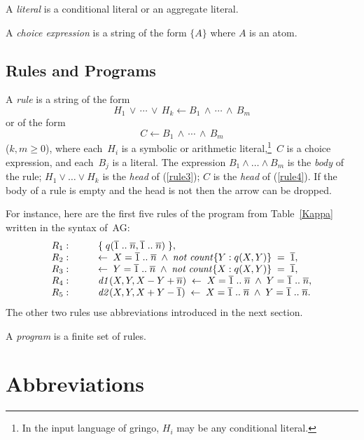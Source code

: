 \documentclass{tlp}
\def\ar{\leftarrow}
\def\beq{\begin{equation}}
\def\eeq#1{\label{#1}\end{equation}}
\def\ba{\begin{array}}
\def\ea{\end{array}}
\def\no{{\it not}}
\begin{document}
A {\sl literal} is a conditional literal or an aggregate literal.

A {\sl choice expression} is a string of the form $\{A\}$ where
$A$ is an atom.


\subsection{Rules and Programs} \label{rp}

A {\sl rule} is a string of the form
\beq
H_1\,\lor\,\cdots\,\lor\,H_k \ar B_1\,\land\,\cdots\,\land\,B_m
\eeq{rule3}
or of the form
\beq
C \ar B_1\,\land\,\cdots\,\land\,B_m
\eeq{rule4}
($k,m\geq 0$), where each~$H_i$ is a symbolic or arithmetic
literal,\footnote{In the input language of {\sc gringo}, $H_i$ may be any
conditional literal.}~$C$ is a choice
expression, and each~$B_j$ is a literal.
The expression $B_1 \land \dots \land B_m$ is the
{\sl body} of the rule; $H_1 \lor \dots \lor H_k$ is the {\sl head}
of (\ref{rule3}); $C$ is the {\sl head} of (\ref{rule4}).
If the body of a rule is empty and the head is not then the arrow can be
dropped. %

For instance, here are the first five rules of the program from
Table~\ref{Kappa} written in the syntax of~AG:
$$
\ba {ll}
  R_1: \qquad  & \{\; q(\overline 1\;..\;\overline n,\overline 1\;..\;\overline n)\; \},\\
  R_2: \qquad  & \ar \; X = \overline 1\;..\;\overline n \; \land \; \no \; {\it count}\{ Y : q(X,Y) \}\;
= \; \overline 1,\\
  R_3: \qquad  & \ar \; Y = \overline 1\;..\;\overline n \; \land \; \no \; {\it count}\{ X : q(X,Y) \}\;
= \; \overline 1,\\
  R_4: \qquad  & {\it d1}(X,Y,X-Y+\overline n) \; \ar \; X = \overline 1\;..\;\overline n \; \land \;
Y = \overline 1\;..\;\overline n,\\
  R_5: \qquad  & {\it d2}(X,Y,X+Y-\overline 1) \; \ar \; X = \overline 1\;..\;\overline n \; \land \;
Y = \overline 1\;..\;\overline n.
\ea
$$
The other two rules use abbreviations introduced in the next section.

A {\sl program} is a finite set of rules.

\section{Abbreviations}\label{abb}
\end{document}
